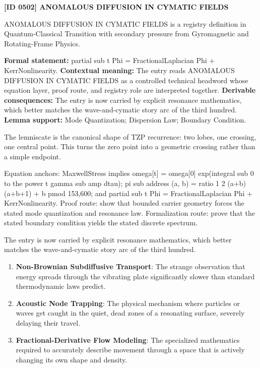 \clearpage
\noindent\textbf{[ID 0502] ANOMALOUS DIFFUSION IN CYMATIC FIELDS}\par
\vspace{0.35em}
\begingroup\small
{}
ANOMALOUS DIFFUSION IN CYMATIC FIELDS is a registry definition in Quantum-Classical Transition with secondary pressure from Gyromagnetic and Rotating-Frame Physics.

\begingroup\footnotesize\setlength{\emergencystretch}{3em}\sloppy
\textbf{Formal statement:} partial sub t Phi = FractionalLaplacian Phi + KerrNonlinearity. \textbf{Contextual meaning:} The entry reads ANOMALOUS DIFFUSION IN CYMATIC FIELDS as a controlled technical headword whose equation layer, proof route, and registry role are interpreted together. \textbf{Derivable consequences:} The entry is now carried by explicit resonance mathematics, which better matches the wave-and-cymatic story arc of the third hundred. \textbf{Lemma support:} Mode Quantization; Dispersion Law; Boundary Condition.\par
\endgroup

The lemniscate is the canonical shape of TZP recurrence: two lobes, one crossing, one central point. This turns the zero point into a geometric crossing rather than a simple endpoint.

Equation anchors: MaxwellStress implies omega[t] = omega[0] exp(integral sub 0 to the power t gamma sub amp dtau); pi sub address (a, b) = ratio 1 2 (a+b)(a+b+1) + b pmod 153,600; and partial sub t Phi = FractionalLaplacian Phi + KerrNonlinearity. Proof route: show that bounded carrier geometry forces the stated mode quantization and resonance law. Formalization route: prove that the stated boundary condition yields the stated discrete spectrum.

The entry is now carried by explicit resonance mathematics, which better matches the wave-and-cymatic story arc of the third hundred.
\endgroup

\begin{enumerate}[leftmargin=1.6em,itemsep=6pt,topsep=4pt]
\item \textbf{Non-Brownian Subdiffusive Transport}: The strange observation that energy spreads through the vibrating plate significantly slower than standard thermodynamic laws predict.
\item \textbf{Acoustic Node Trapping}: The physical mechanism where particles or waves get caught in the quiet, dead zones of a resonating surface, severely delaying their travel.
\item \textbf{Fractional-Derivative Flow Modeling}: The specialized mathematics required to accurately describe movement through a space that is actively changing its own shape and density.
\end{enumerate}

